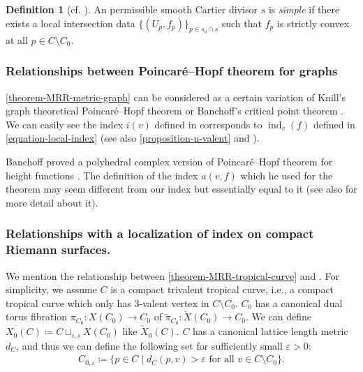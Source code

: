 \documentclass[a4paper,dvipdfmx,reqno,12pt]{amsart}
\theoremstyle{definition}
\newtheorem{definition}[theorem]{Definition}
\newcommand{\deq}{\coloneqq}
\newcommand{\vep}{\varepsilon}%
\newcommand{\opn}[1]{\operatorname{#1}}
\numberwithin{equation}{section}
\begin{document}
\begin{definition}[{cf. \cite{auroux2022lagrangian}}]
An permissible smooth Cartier divisor $s$ is 
\emph{simple} if there exists a local intersection data
$\{(U_p,f_p)\}_{p\in s_0\cap s}$ such that
$f_p$ is strictly convex at all $p\in C\setminus C_0$.
\end{definition}

\subsubsection{Relationships between 
Poincar\'e--Hopf theorem for graphs}

\cref{theorem-MRR-metric-graph} can be considered 
as a certain variation of Knill's graph 
theoretical Poincar\'e--Hopf theorem \cite{knill2012graph}
or 
Banchoff's critical point theorem \cite{MR225327}.
We can easily see the index $i(v)$ defined in 
\cite[]{knill2012graph}
corresponds to $\opn{ind}_v(f)$ defined in 
\cref{equation-local-index} (see also 
\cref{proposition-n-valent} and 
\cite[]{knill2012graph}).

Banchoff proved a polyhedral complex version of Poincar\'e--Hopf theorem
for height functions \cite[Theorem 1]{MR225327}.
The definition of the index $a(v,f)$ 
\cite[p.246]{MR225327} which 
he used for the theorem may seem different 
from our index but essentially equal to it
(see also \cite[p.143-144]{grunert2017piecewise} 
for more detail about it).





\subsubsection{Relationships with a localization of 
index on compact Riemann surfaces.}

We mention the relationship between 
\cref{theorem-MRR-tropical-curve} and
\cite[6]{MR2676658}.
For simplicity,
we assume $C$ is a compact trivalent tropical curve, i.e.,
a compact tropical curve which only has $3$-valent
vertex in $C\setminus C_0$.  
$C_0$ has a canonical dual torus fibration 
$\pi_{C_0}\colon X(C_0)\to C_0$ of
$\check{\pi}_{C_0} \colon \check{X}(C_0)\to C_0$.
We can define $X_0(C)\deq C\sqcup_{i,s} X(C_0)$ like
$\check{X}_0(C)$.
$C$ has a canonical lattice length metric $d_{C}$, and
thus we can define the following set for sufficiently small
$\vep >0$: 
\begin{align}
C_{0,\vep}\deq \{p\in C\mid d_C(p,v)>\vep 
\text{ for all } v\in C\setminus C_0\}.
\end{align}
\end{document}
